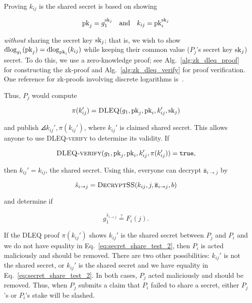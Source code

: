 Proving $k_{ij}$ is the shared secret is based on showing

\begin{equation}
    \textrm{pk}_{j} = g_{1}^{\textrm{sk}_{j}} \quad\text{and}\quad
    k_{ij} = \textrm{pk}_{i}^{\textrm{sk}_{j}}
\end{equation}

\noindent
\emph{without} sharing the secret key $\textrm{sk}_{j}$;
that is, we wish to show
$\operatorname{dlog}_{g_{1}}(\textrm{pk}_{j}) = \operatorname{dlog}_{\textrm{pk}_{i}}(k_{ij})$
while keeping their common value ($P_{j}$'s secret key $\textrm{sk}_{j}$) secret.
To do this, we use a zero-knowledge proof;
see Alg.~\ref{alg:zk_dleq_proof} for constructing the zk-proof
and Alg.~\ref{alg:zk_dleq_verify} for proof verification.
One reference for zk-proofs involving discrete logarithms
is~\cite{camenisch1997proof}.

Thus, $P_{j}$ would compute

\begin{equation}
    \pi(k_{ij}') = \textsc{DLEQ}(g_{1},\textrm{pk}_{j},\textrm{pk}_{i},k_{ij}',\textrm{sk}_{j})
\end{equation}

\noindent
and publish $\angles{k_{ij}',\pi(k_{ij}')}$, where $k_{ij}'$
is claimed shared secret.
This allows anyone to use \textsc{DLEQ-verify} to determine
its validity.
If

\begin{equation}
    \textsc{DLEQ-verify}(g_{1},\textrm{pk}_{j},\textrm{pk}_{i},k_{ij}',\pi(k_{ij}'))
        = \texttt{true},
\end{equation}

\noindent
then $k_{ij}' = k_{ij}$, the shared secret.
Using this, everyone can decrypt $\overline{\texttt{s}}_{i\to j}$
by

\begin{equation}
    \hat{s}_{i\to j}
        = \textsc{DecryptSS}(k_{ij},j,\overline{\texttt{s}}_{i\to j}, b)
\end{equation}

\noindent
and determine if

\begin{equation}
    g_{1}^{\hat{s}_{i\to j}} \overset{?}{=} F_{i}(j).
    \label{eq:secret_share_test_2}
\end{equation}

\noindent
If the DLEQ proof $\pi(k_{ij}')$ shows $k_{ij}'$ is the shared
secret between $P_{j}$ and $P_{i}$ and we do not have equality in
Eq.~\eqref{eq:secret_share_test_2}, then $P_{i}$ is acted maliciously
and should be removed.
There are two other possibilities:
$k_{ij}'$ is not the shared secret, or $k_{ij}'$ is the shared secret
and we have equality in Eq.~\eqref{eq:secret_share_test_2}.
In both cases, $P_{j}$ acted maliciously and should be removed.
Thus, when $P_{j}$ submits a claim that $P_{i}$
failed to share a secret,
either $P_{j}$'s or $P_{i}$'s stake will be slashed.

